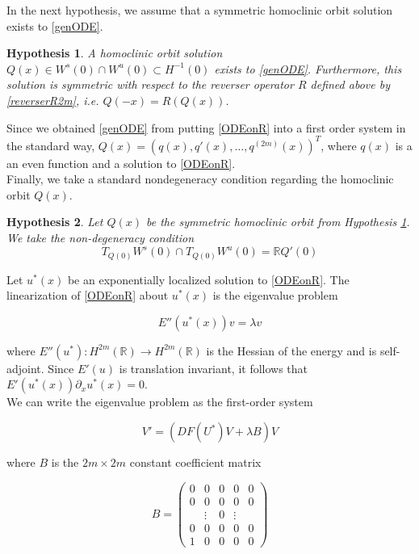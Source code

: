 \documentclass[12pt]{article}
\def\R{{\mathbb R}}
\newtheorem{hypothesis}{Hypothesis}
\begin{document}
In the next hypothesis, we assume that a symmetric homoclinic orbit solution exists to \eqref{genODE}.

\begin{hypothesis}\label{qexistshyp}
A homoclinic orbit solution $Q(x) \in W^s(0) \cap W^u(0) \subset H^{-1}(0)$ exists to \eqref{genODE}. Furthermore, this solution is symmetric with respect to the reverser operator $R$ defined above by \eqref{reverserR2m}, i.e. $Q(-x) = R(Q(x))$.
\end{hypothesis}
 
Since we obtained \eqref{genODE} from putting \eqref{ODEonR} into a first order system in the standard way, $Q(x) = (q(x), q'(x), \dots, q^{(2m)}(x))^T$, where $q(x)$ is a an even function and a solution to \eqref{ODEonR}.\\

Finally, we take a standard nondegeneracy condition regarding the homoclinic orbit $Q(x)$.

\begin{hypothesis}\label{nondegen1}
Let $Q(x)$ be the symmetric homoclinic orbit from Hypothesis \ref{qexistshyp}. We take the non-degeneracy condition
\begin{equation}
T_{Q(0)}W^s(0) \cap T_{Q(0)}W^u(0) = \R Q'(0)
\end{equation}
\end{hypothesis}

Let $u^*(x)$ be an exponentially localized solution to \eqref{ODEonR}. The linearization of \eqref{ODEonR} about $u^*(x)$ is the eigenvalue problem

\begin{equation}\label{ODEeig}
E''(u^*(x)) v = \lambda v
\end{equation}

where $E''(u^*): H^{2m}(\R) \rightarrow H^{2m}(\R)$ is the Hessian of the energy and is self-adjoint. Since $E'(u)$ is translation invariant, it follows that $E'(u^*(x)) \partial_x u^*(x) = 0$.\\

We can write the eigenvalue problem as the first-order system

\begin{equation}\label{ODEeig2}
V' = ( DF(U^*)V + \lambda B) V 
\end{equation}

where $B$ is the $2m \times 2m$ constant coefficient matrix

\begin{equation}
B = \begin{pmatrix}0 & 0 & 0 & 0 & 0 \\0 & 0 & 0 & 0 & 0 \\  & 
\vdots & 0 & \vdots & \\0 & 0 & 0 & 0 & 0 \\1 & 0 & 0 & 0 & 0 \end{pmatrix} 
\end{equation}
\end{document}
